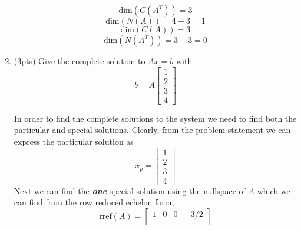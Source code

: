 \begin{enumerate}[label=(\alph*)]
\begin{mdframed}[style=MyFrame]
\begin{equation}
                \text{dim}(C(A^{T})) = 3
            \end{equation}
            \begin{equation}
                \text{dim}(N(A)) = 4-3 = 1
            \end{equation}
            \begin{equation}
                \text{dim}(C(A)) = 3
            \end{equation}
            \begin{equation}
                \text{dim}(N(A^{T})) = 3-3 = 0
            \end{equation}
        \end{mdframed}

    \item (3pts) Give the complete solution to $Ax=b$ with
        \begin{equation}
            b = 
            A 
            \begin{bmatrix}
                1   \\
                2   \\
                3   \\
                4
            \end{bmatrix}
        \end{equation}
        \begin{mdframed}[style=MyFrame]
            In order to find the complete solutions to the system we need
            to find both the particular and special solutions. Clearly,
            from the problem statement we can express the particular
            solution as
            \begin{equation}
                x_{p} =
                \begin{bmatrix}
                    1       \\
                    2       \\
                    3       \\
                    4
                \end{bmatrix}
            \end{equation}
            Next we can find the \emph{\textbf{one}} special solution using
            the nullspace of $A$ which we can find from the row reduced
            echelon form, 
            \begin{equation}
                \text{rref}(A) =
                \begin{bmatrix}
                    1       &   0   &   0   &   -3/2    \\

\end{bmatrix}
\end{equation}
\end{mdframed}
\end{enumerate}

